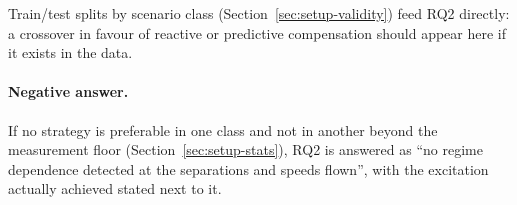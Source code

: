 Train/test splits by scenario class (Section~\ref{sec:setup-validity}) feed RQ2 directly: a crossover
in favour of reactive or predictive compensation should appear here if it exists in the data.
\paragraph{Negative answer.} If no strategy is preferable in one class and not in another beyond the
measurement floor (Section~\ref{sec:setup-stats}), RQ2 is answered as ``no regime dependence detected at the separations and
speeds flown'', with the excitation actually achieved stated next to it.
